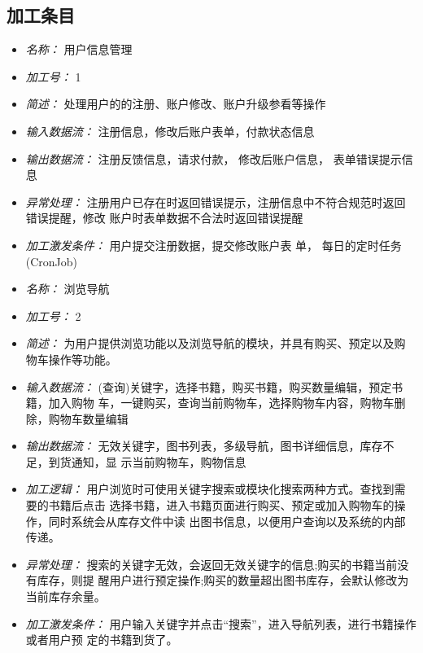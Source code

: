 \vspace{-1mm}

\subsection{加工条目}
\begin{itemize}
\item \textit{名称： }用户信息管理
\item \textit{加工号： }1
\item \textit{简述： }处理用户的的注册、账户修改、账户升级参看等操作
\item \textit{输入数据流： } 注册信息，修改后账户表单，付款状态信息
\item \textit{输出数据流： } 注册反馈信息，请求付款， 修改后账户信息， 表单错误提示信息 
\item \textit{异常处理： } 注册用户已存在时返回错误提示，注册信息中不符合规范时返回错误提醒，修改 账户时表单数据不合法时返回错误提醒 
\item \textit{加工激发条件： }用户提交注册数据，提交修改账户表 单， 每日的定时任务(CronJob)

\end{itemize}


\vspace{-1mm}


\begin{itemize}
\item \textit{名称： }浏览导航
\item \textit{加工号： }2 
\item \textit{简述： }为用户提供浏览功能以及浏览导航的模块，并具有购买、预定以及购物车操作等功能。 
\item \textit{输入数据流： }(查询)关键字，选择书籍，购买书籍，购买数量编辑，预定书籍，加入购物 车，一键购买，查询当前购物车，选择购物车内容，购物车删除，购物车数量编辑 
\item \textit{输出数据流： }无效关键字，图书列表，多级导航，图书详细信息，库存不足，到货通知，显 示当前购物车，购物信息
\item \textit{加工逻辑： }用户浏览时可使用关键字搜索或模块化搜索两种方式。查找到需要的书籍后点击 选择书籍，进入书籍页面进行购买、预定或加入购物车的操作，同时系统会从库存文件中读 出图书信息，以便用户查询以及系统的内部传递。 
\item \textit{异常处理： }搜索的关键字无效，会返回无效关键字的信息;购买的书籍当前没有库存，则提 醒用户进行预定操作;购买的数量超出图书库存，会默认修改为当前库存余量。 
\item \textit{加工激发条件： }用户输入关键字并点击“搜索”，进入导航列表，进行书籍操作或者用户预 定的书籍到货了。

\end{itemize}


